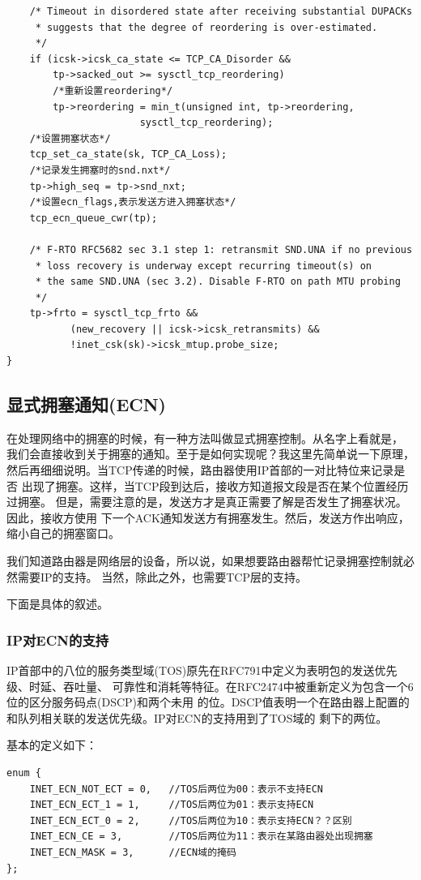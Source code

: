 \begin{verbatim}
	/* Timeout in disordered state after receiving substantial DUPACKs
	 * suggests that the degree of reordering is over-estimated.
	 */
	if (icsk->icsk_ca_state <= TCP_CA_Disorder &&
	    tp->sacked_out >= sysctl_tcp_reordering)
		/*重新设置reordering*/
		tp->reordering = min_t(unsigned int, tp->reordering,
				       sysctl_tcp_reordering);
	/*设置拥塞状态*/	
	tcp_set_ca_state(sk, TCP_CA_Loss);
	/*记录发生拥塞时的snd.nxt*/
	tp->high_seq = tp->snd_nxt;
	/*设置ecn_flags,表示发送方进入拥塞状态*/	
	tcp_ecn_queue_cwr(tp);

	/* F-RTO RFC5682 sec 3.1 step 1: retransmit SND.UNA if no previous
	 * loss recovery is underway except recurring timeout(s) on
	 * the same SND.UNA (sec 3.2). Disable F-RTO on path MTU probing
	 */
	tp->frto = sysctl_tcp_frto &&
		   (new_recovery || icsk->icsk_retransmits) &&
		   !inet_csk(sk)->icsk_mtup.probe_size;
}
\end{verbatim}

	\subsection{显式拥塞通知(ECN)}
		在处理网络中的拥塞的时候，有一种方法叫做显式拥塞控制。从名字上看就是，
		我们会直接收到关于拥塞的通知。至于是如何实现呢？我这里先简单说一下原理，
		然后再细细说明。当TCP传递的时候，路由器使用IP首部的一对比特位来记录是否
		出现了拥塞。这样，当TCP段到达后，接收方知道报文段是否在某个位置经历过拥塞。
		但是，需要注意的是，发送方才是真正需要了解是否发生了拥塞状况。因此，接收方使用
		下一个ACK通知发送方有拥塞发生。然后，发送方作出响应，缩小自己的拥塞窗口。

		我们知道路由器是网络层的设备，所以说，如果想要路由器帮忙记录拥塞控制就必然需要IP的支持。
		当然，除此之外，也需要TCP层的支持。

		下面是具体的叙述。

		\subsubsection{IP对ECN的支持}

			IP首部中的八位的服务类型域(TOS)原先在RFC791中定义为表明包的发送优先级、时延、吞吐量、
			可靠性和消耗等特征。在RFC2474中被重新定义为包含一个6位的区分服务码点(DSCP)和两个未用
			的位。DSCP值表明一个在路由器上配置的和队列相关联的发送优先级。IP对ECN的支持用到了TOS域的
			剩下的两位。

			基本的定义如下：
\begin{verbatim}
enum {
	INET_ECN_NOT_ECT = 0,	//TOS后两位为00：表示不支持ECN
	INET_ECN_ECT_1 = 1,		//TOS后两位为01：表示支持ECN
	INET_ECN_ECT_0 = 2,		//TOS后两位为10：表示支持ECN？？区别
	INET_ECN_CE = 3,		//TOS后两位为11：表示在某路由器处出现拥塞
	INET_ECN_MASK = 3,		//ECN域的掩码
};
\end{verbatim}


